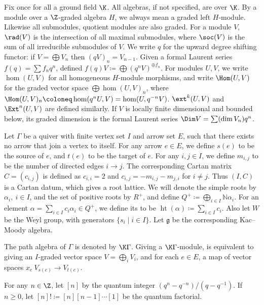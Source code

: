 \begin{convention}
    Fix once for all a ground field $\K$. All algebras, if not specified, are over $\K$.
    By a module over a $\Z$-graded algebra $H$, we always mean a graded left
    $H$-module. Likewise all submodules, quotient modules are also graded.
    For a module $V$, $\rad(V)$ is the intersection of all maximal submodules,
    where $\soc(V)$ is the sum of all irreducible submodules of $V$.
    We write $q$ for the upward degree shifting functor: if $V = \bigoplus V_n$
    then $(qV)_n = V_{n-1}$. Given a formal Laurent series $f(q) = \sum f_nq^n$,
    defined $f(q)V\coloneq  \bigoplus (q^nV)^{\oplus f_n}$. For modules $U,V$,
    we write $\hom(U,V)$ for all homogeneous $H$-module morphisms, and write
    $\Hom(U,V)$ for the graded vector space $\bigoplus\hom(U,V)_n$,
    where $\Hom(U,V)_n\coloneq  \hom(q^nU,V) = \hom(U,q^{-n}V)$. $\ext^k(U,V)$
    and $\Ext^n(U,V)$ are defined similarly. If $V$ is locally finite dimensional
    and bounded below, its graded dimension is the formal Laurent series
    $\Dim V = \sum(\dim V_n)q^n$.

    Let $\Gamma$ be a quiver with finite vertex set $I$
    and arrow set $E$, such that there exists no arrow
    that join a vertex to itself. For any arrow $e\in E$,
    we define $s(e)$ to be the source of $e$, and 
    $t(e)$ to be the target of $e$. For any $i,j\in I$, we define
    $m_{i,j}$ to be the number of directed edges $i\to j$. 
    The corresponding Cartan matrix $C = (c_{i,j})$ 
    is defined as $c_{i,i} = 2$ and $c_{i,j} = -m_{i,j}-m_{j,i}$ for $i\ne j$.
    Thus $(I,C)$ is a Cartan datum, which gives a root lattice.
    We will denote the simple roots by $\alpha_i,\ i\in I$, and the set of positive roots by
    $R^+$, and define $Q^+ \coloneq  \bigoplus_{i\in I}\mathbb{N}\alpha_i$. For 
    an element $\alpha = \sum_{i\in I}c_i\alpha_i\in Q^+$, we define its 
    to be $\operatorname{ht}(\alpha) \coloneq  \sum_{i\in I}c_i$. Also let $W$ be the Weyl group, with generators
    $\{s_i\mid i\in I\}$. Let $\mathfrak{g}$ be the corresponding Kac--Moody
    algebra.

    The path algebra of $\Gamma$ is denoted by $\K\Gamma$.
    Giving a $\K\Gamma$-module, is equivalent to giving an $I$-graded vector space
    $V = \bigoplus_i V_i$, and for each $e\in E$, a map of vector spaces $x_e\:V_{s(e)}\to V_{t(e)}$.

    For any $n\in\Z$, let $[n]$ by the quantum
    integer $(q^n-q^{-n})/(q-q^{-1})$. If $n\ge 0$, let $[n]! \coloneq  [n][n-1]\cdots[1]$
    be the quantum factorial. 
\end{convention}

